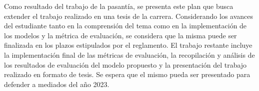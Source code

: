 \documentclass[10pt]{article}
\newcommand{\tripleSignature}[3]{
\begin{minipage}[c]{\textwidth}

\vspace{1.5cm}

\makebox[12cm][c]{
\qquad \qquad \qquad \qquad \qquad \makebox[5cm][c] {\hrulefill} \quad \makebox[5cm][c] {\hrulefill} \quad \makebox[5cm][c] {\hrulefill}
}
\makebox[14cm][c]{
\qquad \qquad \qquad #1 \qquad \qquad  #2 \qquad #3 
}
\end{minipage}
}
\begin{document}
Como resultado del trabajo de la pasantía, se presenta este plan que busca
extender el trabajo realizado en una tesis de la carrera. Considerando los
avances del estudiante tanto en la comprensión del tema como en la
implementación de los modelos y la métrica de evaluación, se considera que la
misma puede ser finalizada en los plazos estipulados por el reglamento. El
trabajo restante incluye la implementación final de las métricas de evaluación,
la recopilación y análisis de los resultados de evaluación del modelo propuesto
y la presentación del trabajo realizado en formato de tesis. Se espera que el
mismo pueda ser presentado para defender a mediados del año 2023.




{\small

}
\end{document}
